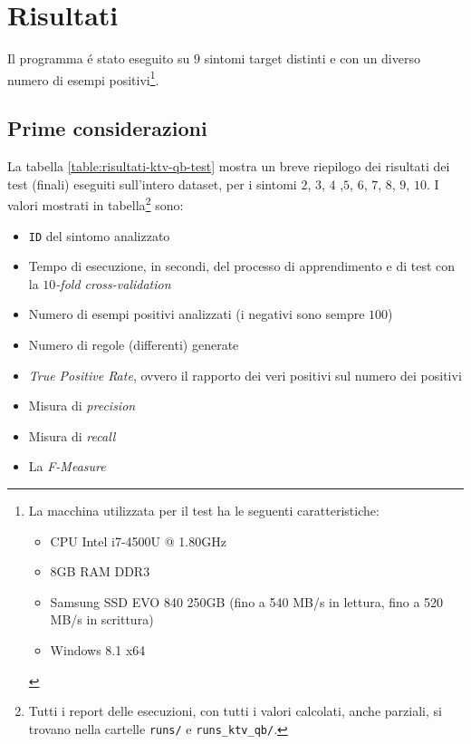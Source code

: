 \documentclass[preprint]{acm_proc_article-sp}
\begin{document}
\section{Risultati}
Il programma \'e stato eseguito su $9$ sintomi target distinti e con un diverso numero di esempi positivi\footnote{La macchina utilizzata per il test ha le seguenti caratteristiche:
\begin{itemize}
\item CPU Intel i7-4500U @ 1.80GHz
\item 8GB RAM DDR3
\item Samsung SSD EVO 840 250GB (fino a 540 MB/s in lettura, fino a 520 MB/s in scrittura)
\item Windows 8.1 x64
\end{itemize}}.

\subsection{Prime considerazioni}

La tabella \ref{table:risultati-ktv-qb-test} mostra un breve riepilogo dei risultati dei test (finali) eseguiti sull'intero dataset, per i sintomi $2$, $3$, $4$ ,$5$, $6$, $7$, $8$, $9$, $10$. I valori mostrati in tabella\footnote{Tutti i report delle esecuzioni, con tutti i valori calcolati, anche parziali, si trovano nella cartelle \verb|runs/| e \verb|runs_ktv_qb/|.} sono:
\begin{itemize}
\item \verb|ID| del sintomo analizzato
\item Tempo di esecuzione, in secondi, del processo di apprendimento e di test con la $10$\textit{-fold cross-validation}
\item Numero di esempi positivi analizzati (i negativi sono sempre $100$)
\item Numero di regole (differenti) generate
\item \textit{True Positive Rate}, ovvero il rapporto dei veri positivi sul numero dei positivi
\item Misura di \textit{precision}
\item Misura di \textit{recall}
\item La \textit{F-Measure}
\end{itemize}
\end{document}
